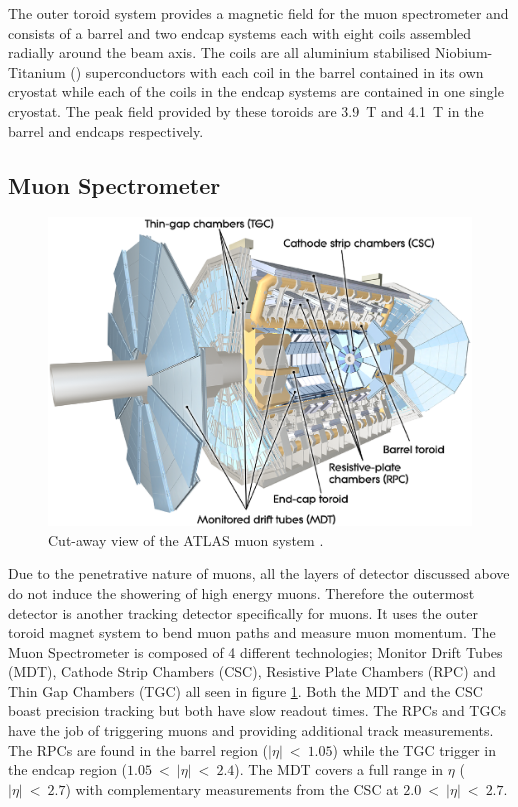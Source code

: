 		The outer toroid system provides a magnetic field for the muon spectrometer and consists of a barrel and two endcap systems each with eight coils assembled radially around the beam axis. The coils are all aluminium stabilised Niobium-Titanium () superconductors with each coil in the barrel contained in its own cryostat while each of the coils in the endcap systems are contained in one single cryostat. The peak field provided by these toroids are \SI{3.9}{T} and \SI{4.1}{T} in the barrel and endcaps respectively.

	


	\subsection{Muon Spectrometer}

		\begin{figure}[h!]
			\begin{center}
				\includegraphics[width=0.95\linewidth]{images/MuonSystem_d3.eps}
			\end{center}
			\caption{ Cut-away view of the ATLAS muon system \cite{Aad:1129811}.}
			\label{fig:ATLAS_muon}
		\end{figure}

		Due to the penetrative nature of muons, all the layers of detector discussed above do not induce the showering of high energy muons. Therefore the outermost detector is another tracking detector specifically for muons. It uses the outer toroid magnet system to bend muon paths and measure muon momentum. The Muon Spectrometer is composed of 4 different technologies; Monitor Drift Tubes (MDT), Cathode Strip Chambers (CSC), Resistive Plate Chambers (RPC) and Thin Gap Chambers (TGC) all seen in figure \ref{fig:ATLAS_muon}. Both the MDT and the CSC boast precision tracking but both have slow readout times. The RPCs and TGCs have the job of triggering muons and providing additional track measurements. The RPCs are found in the barrel region ($|\eta|~<~1.05$) while the TGC trigger in the endcap region ($1.05~<~|\eta|~<~2.4$). The MDT covers a full range in $\eta$ ($|\eta|~<~2.7$) with complementary measurements from the CSC at $2.0~<~|\eta|~<~2.7$.





